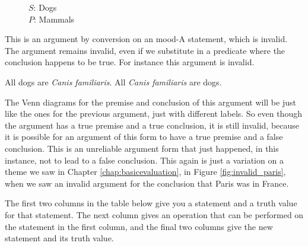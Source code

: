 \begin{figure}[H]
\begin{center}
\end{center}
\captionsetup{singlelinecheck=on}
\caption*{$S$: Dogs \\ $P$: Mammals}
\end{figure}

This is an argument by conversion on an mood-A statement, which is invalid. The argument remains invalid, even if we substitute in a predicate where the conclusion happens to be true. For instance this argument is invalid.

\begin{earg*}
\item  All dogs are \textit{Canis familiaris}.
\itemc[.4] All \textit{Canis familiaris} are dogs. 
\end{earg*}

The Venn diagrams for the premise and conclusion of this argument will be just like the ones for the previous argument, just with different labels. So even though the argument has a true premise and a true conclusion, it is still invalid, because it is possible for an argument of this form to have a true premise and a false conclusion. This is an unreliable argument form that just happened, in this instance, not to lead to a false conclusion. This again is just a variation on a theme we saw in Chapter \ref{chap:basicevaluation}, in Figure \ref{fig:invalid_paris}, when we saw an invalid argument for the conclusion that Paris was in France.



\practiceproblems
\problempart The first two columns in the table below give you a statement and a truth value for that statement. The next column gives an operation that can be performed on the statement in the first column, and the final two columns give the new statement and its truth value. 

